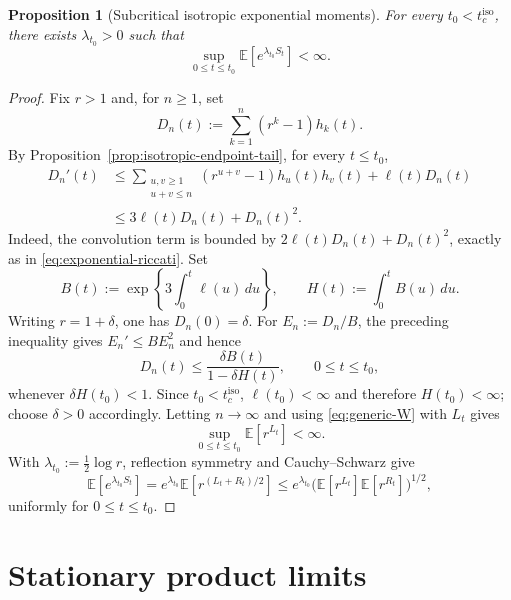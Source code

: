 \documentclass[11pt,a4paper]{amsart}
\newtheorem{proposition}[theorem]{Proposition}
\theoremstyle{remark}
\begin{document}
\begin{proposition}[Subcritical isotropic exponential moments]
\label{prop:isotropic-exponential-moments}
For every $t_0<t_c^{\mathrm{iso}}$, there exists $\lambda_{t_0}>0$ such that
\[
        \sup_{0\leq t\leq t_0}
        \mathbb{E}[e^{\lambda_{t_0}S_t}]<\infty.
\]
\end{proposition}

\begin{proof}
Fix $r>1$ and, for $n\geq1$, set
\[
        D_n(t):=\sum_{k=1}^n(r^k-1)h_k(t).
\]
By Proposition~\ref{prop:isotropic-endpoint-tail}, for every
$t\leq t_0$,
\begin{align*}
        D_n'(t)
        &\leq
        \sum_{\substack{u,v\geq1\\u+v\leq n}}
        (r^{u+v}-1)h_u(t)h_v(t)+\ell(t)D_n(t)\\
        &\leq 3\ell(t)D_n(t)+D_n(t)^2.
\end{align*}
Indeed, the convolution term is bounded by
$2\ell(t)D_n(t)+D_n(t)^2$, exactly as in
\eqref{eq:exponential-riccati}. Set
\[
        B(t):=\exp\left\{3\int_0^t\ell(u)\,du\right\},
        \qquad
        H(t):=\int_0^tB(u)\,du.
\]
Writing $r=1+\delta$, one has $D_n(0)=\delta$. For
$E_n:=D_n/B$, the preceding inequality gives $E_n'\leq BE_n^2$ and hence
\[
        D_n(t)
        \leq
        \frac{\delta B(t)}{1-\delta H(t)},
        \qquad 0\leq t\leq t_0,
\]
whenever $\delta H(t_0)<1$. Since $t_0<t_c^{\mathrm{iso}}$,
$\ell(t_0)<\infty$ and therefore $H(t_0)<\infty$; choose
$\delta>0$ accordingly. Letting $n\to\infty$ and using  \eqref{eq:generic-W} with $L_t$ 
gives
\[
        \sup_{0\leq t\leq t_0}\mathbb{E}[r^{L_t}]<\infty.
\]
With $\lambda_{t_0}:=\frac12\log r$, reflection symmetry and
Cauchy--Schwarz give
\[
        \mathbb{E}[e^{\lambda_{t_0}S_t}]
        =e^{\lambda_{t_0}}
        \mathbb{E}\left[r^{(L_t+R_t)/2}\right]
        \leq
        e^{\lambda_{t_0}}
        \bigl(\mathbb{E}[r^{L_t}]\mathbb{E}[r^{R_t}]\bigr)^{1/2},
\]
uniformly for $0\leq t\leq t_0$.
\end{proof}

\section{Stationary product limits}
\label{sec:stationary-limits}
\end{document}
